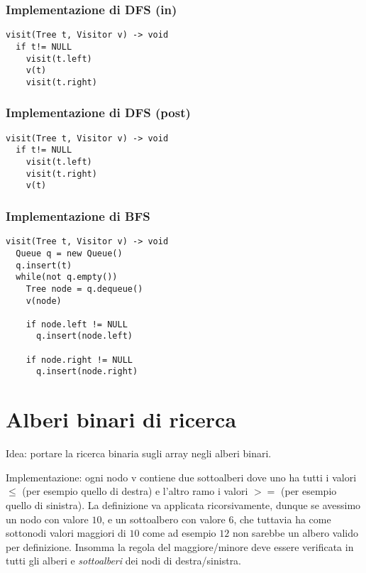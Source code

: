 \documentclass{article}
\begin{document}
\subsubsection{Implementazione di DFS (in)}

\begin{lstlisting}
visit(Tree t, Visitor v) -> void
  if t!= NULL
    visit(t.left)
    v(t)
    visit(t.right)
\end{lstlisting}

\subsubsection{Implementazione di DFS (post)}

\begin{lstlisting}
visit(Tree t, Visitor v) -> void
  if t!= NULL
    visit(t.left)
    visit(t.right)
    v(t)
\end{lstlisting}

\subsubsection{Implementazione di BFS}

\begin{lstlisting}
visit(Tree t, Visitor v) -> void
  Queue q = new Queue()
  q.insert(t)
  while(not q.empty())
    Tree node = q.dequeue()
    v(node)

    if node.left != NULL
      q.insert(node.left)

    if node.right != NULL
      q.insert(node.right)
\end{lstlisting}

\section{Alberi binari di ricerca}
Idea: portare la ricerca binaria sugli array negli alberi binari.

Implementazione: ogni nodo v contiene due sottoalberi dove uno ha tutti i
valori $\leq$ (per esempio quello di destra) e l'altro ramo i valori $>=$
(per esempio quello di sinistra). La definizione va applicata ricorsivamente,
dunque se avessimo un nodo con valore $10$, e un sottoalbero con valore $6$, che
tuttavia ha come sottonodi valori maggiori di $10$ come ad esempio $12$ non sarebbe
un albero valido per definizione. Insomma la regola del maggiore/minore deve essere
verificata in tutti gli alberi e \emph{sottoalberi} dei nodi di destra/sinistra.
\end{document}
